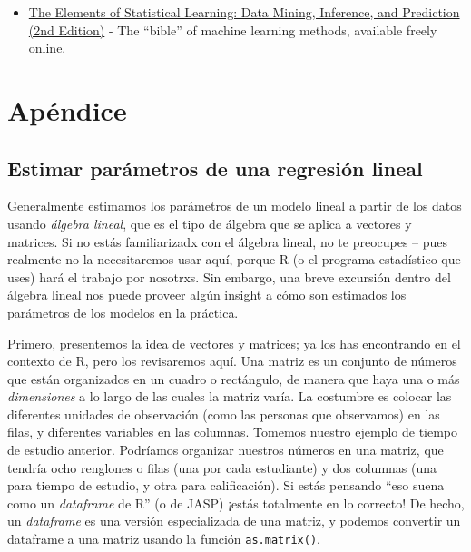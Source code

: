 \documentclass[
  12pt,
]{book}
\providecommand{\tightlist}{%
  \setlength{\itemsep}{0pt}\setlength{\parskip}{0pt}}
\begin{document}
\begin{itemize}
\tightlist
\item
  \href{https://web.stanford.edu/~hastie/Papers/ESLII.pdf}{The Elements of Statistical Learning: Data Mining, Inference, and Prediction (2nd Edition)} - The ``bible'' of machine learning methods, available freely online.
\end{itemize}

\hypertarget{apuxe9ndice-5}{%
\section{Apéndice}\label{apuxe9ndice-5}}

\hypertarget{estimar-paruxe1metros-de-una-regresiuxf3n-lineal}{%
\subsection{Estimar parámetros de una regresión lineal}\label{estimar-paruxe1metros-de-una-regresiuxf3n-lineal}}

Generalmente estimamos los parámetros de un modelo lineal a partir de los datos usando \emph{álgebra lineal}, que es el tipo de álgebra que se aplica a vectores y matrices. Si no estás familiarizadx con el álgebra lineal, no te preocupes -- pues realmente no la necesitaremos usar aquí, porque R (o el programa estadístico que uses) hará el trabajo por nosotrxs. Sin embargo, una breve excursión dentro del álgebra lineal nos puede proveer algún insight a cómo son estimados los parámetros de los modelos en la práctica.

Primero, presentemos la idea de vectores y matrices; ya los has encontrando en el contexto de R, pero los revisaremos aquí. Una matriz es un conjunto de números que están organizados en un cuadro o rectángulo, de manera que haya una o más \emph{dimensiones} a lo largo de las cuales la matriz varía. La costumbre es colocar las diferentes unidades de observación (como las personas que observamos) en las filas, y diferentes variables en las columnas. Tomemos nuestro ejemplo de tiempo de estudio anterior. Podríamos organizar nuestros números en una matriz, que tendría ocho renglones o filas (una por cada estudiante) y dos columnas (una para tiempo de estudio, y otra para calificación). Si estás pensando ``eso suena como un \emph{dataframe} de R'' (o de JASP) ¡estás totalmente en lo correcto! De hecho, un \emph{dataframe} es una versión especializada de una matriz, y podemos convertir un dataframe a una matriz usando la función \texttt{as.matrix()}.
\end{document}
